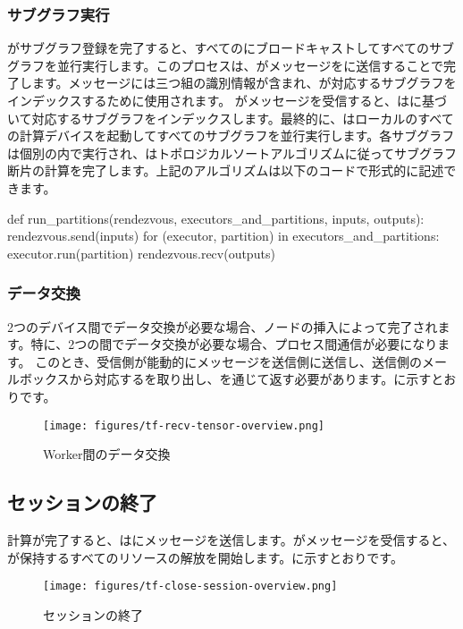 \begin{content}
\subsubsection{サブグラフ実行}
がサブグラフ登録を完了すると、すべてのにブロードキャストしてすべてのサブグラフを並行実行します。このプロセスは、がメッセージをに送信することで完了します。メッセージには三つ組の識別情報が含まれ、が対応するサブグラフをインデックスするために使用されます。
がメッセージを受信すると、はに基づいて対応するサブグラフをインデックスします。最終的に、はローカルのすべての計算デバイスを起動してすべてのサブグラフを並行実行します。各サブグラフは個別の内で実行され、はトポロジカルソートアルゴリズムに従ってサブグラフ断片の計算を完了します。上記のアルゴリズムは以下のコードで形式的に記述できます。
\begin{leftbar}
\begin{python}
\end{python}
def run_partitions(rendezvous, executors_and_partitions, inputs, outputs):
  rendezvous.send(inputs)
  for (executor, partition) in executors_and_partitions: 
    executor.run(partition)
  rendezvous.recv(outputs)
\end{leftbar}
\subsubsection{データ交換}
2つのデバイス間でデータ交換が必要な場合、ノードの挿入によって完了されます。特に、2つの間でデータ交換が必要な場合、プロセス間通信が必要になります。
このとき、受信側が能動的にメッセージを送信側に送信し、送信側のメールボックスから対応するを取り出し、を通じて返す必要があります。に示すとおりです。
\begin{figure}[!h]
\centering
\texttt{[image: figures/tf-recv-tensor-overview.png]}
\caption{Worker間のデータ交換}
\label{fig:tf-recv-tensor-overview}
\end{figure}
\subsection{セッションの終了}
計算が完了すると、はにメッセージを送信します。がメッセージを受信すると、が保持するすべてのリソースの解放を開始します。に示すとおりです。
\begin{figure}[!h]
\centering
\texttt{[image: figures/tf-close-session-overview.png]}
\caption{セッションの終了}
\label{fig:tf-close-session-overview}
\end{figure}
\end{content}
